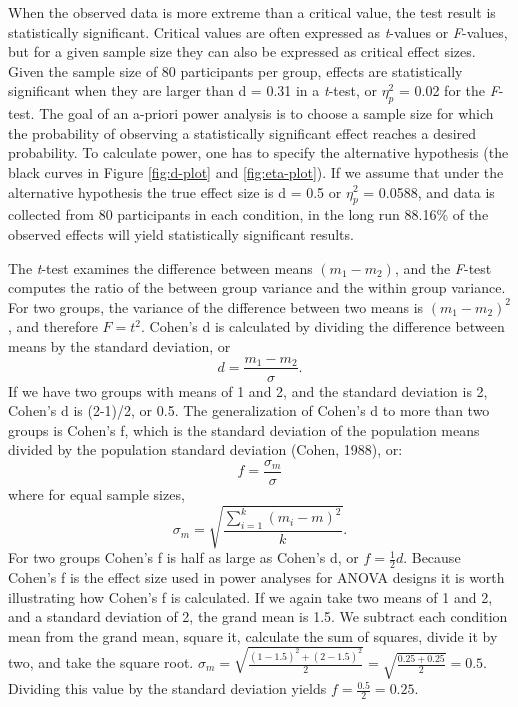 \documentclass[,jou,floatsintext]{apa6}
\begin{document}
When the observed data is more extreme than a critical value, the test result is statistically significant.
Critical values are often expressed as \emph{t}-values or \emph{F}-values, but for a given sample size they can also be expressed as critical effect sizes.
Given the sample size of 80 participants per group, effects are statistically significant when they are larger than d = 0.31 in a \emph{t}-test, or \(\eta_p^2\) = 0.02 for the \emph{F}-test.
The goal of an a-priori power analysis is to choose a sample size for which the probability of observing a statistically significant effect reaches a desired probability.
To calculate power, one has to specify the alternative hypothesis (the black curves in Figure \ref{fig:d-plot} and \ref{fig:eta-plot}).
If we assume that under the alternative hypothesis the true effect size is d = 0.5 or \(\eta_p^2\) = 0.0588, and data is collected from 80 participants in each condition, in the long run 88.16\% of the observed effects will yield statistically significant results.

The \emph{t}-test examines the difference between means \((m_1 - m_2)\), and the \emph{F}-test computes the ratio of the between group variance and the within group variance.
For two groups, the variance of the difference between two means is \((m_1 - m_2)^2\), and therefore \(F = t^2\).
Cohen's d is calculated by dividing the difference between means by the standard deviation, or
\begin{equation}
d = \frac{m_1-m_2}{\sigma}.
\end{equation}
If we have two groups with means of 1 and 2, and the standard deviation is 2, Cohen's d is (2-1)/2, or 0.5.
The generalization of Cohen's d to more than two groups is Cohen's f, which is the standard deviation of the population means divided by the population standard deviation (Cohen, 1988), or:
\begin{equation}
f = \frac{\sigma _{ m }}{\sigma}
\end{equation}
where for equal sample sizes,
\begin{equation}
\sigma _{ m } = \sqrt { \frac { \sum_ { i = 1 } ^ { k } ( m _ { i } - m ) ^ { 2 } } { k } }.
\end{equation}
For two groups Cohen's f is half as large as Cohen's d, or \(f = \frac{1}{2}d\).
Because Cohen's f is the effect size used in power analyses for ANOVA designs it is worth illustrating how Cohen's f is calculated.
If we again take two means of 1 and 2, and a standard deviation of 2, the grand mean is 1.5.
We subtract each condition mean from the grand mean, square it, calculate the sum of squares, divide it by two, and take the square root.
\(\sigma_m = \sqrt{\frac{(1-1.5)^2+(2-1.5)^2}{2}} = \sqrt{\frac{0.25+0.25}{2}} = 0.5\).
Dividing this value by the standard deviation yields \(f = \frac{0.5}{2} = 0.25.\)
\end{document}
